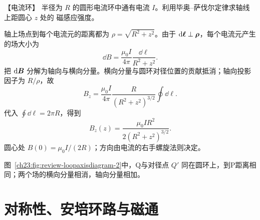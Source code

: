 {\begin{origexamplebox}{【电流环】}\label{ch23:ex:s39-8-3}
半径为 $R$ 的圆形电流环中通有电流 $I$。利用毕奥--萨伐尔定律求轴线上距圆心 $z$ 处的
磁感应强度。

\begin{center}\end{center}
\end{origexamplebox}

\begin{xesolution}
轴上场点到每个电流元的距离都为 $\rho=\sqrt{R^2+z^2}$。由于
$\mathop{}\!\mathrm d\bm{\ell}\perp\bm{\rho}$，每个电流元产生的场大小为
\[
  \dd B=\frac{\mu_0I}{4\pi}\frac{\dd\ell}{R^2+z^2}.
\]
把 $\mathop{}\!\mathrm d\bm{B}$ 分解为轴向与横向分量。横向分量与圆环对径位置的贡献抵消；轴向投影因子为
$R/\rho$，故
\[
  B_z=\frac{\mu_0I}{4\pi}
  \frac{R}{(R^2+z^2)^{3/2}}\oint\dd\ell.
\]
代入 $\oint\dd\ell=2\pi R$，得到
\begin{equation}
  \boxed{B_z(z)=\frac{\mu_0IR^2}{2(R^2+z^2)^{3/2}}}.
\end{equation}
圆心处 $B(0)=\mu_0I/(2R)$；方向由电流的右手螺旋法则决定。

图~\ref{ch23:fig:review-loopaxisdiagram-2}中，Q与对径点 $Q\prime$ 同在圆环上，到P距离相同；两个场的横向分量相消，轴向分量相加。
\par\noindent\begin{minipage}{\linewidth}
\loopAxisDiagram
{}
\end{minipage}\par\medskip
\end{xesolution}



\section{对称性、安培环路与磁通}

}
